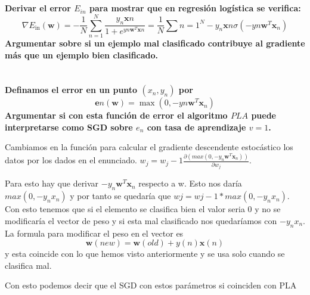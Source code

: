 \documentclass[titlepage]{article}
\begin{document}
  \section{}
	\textbf{Derivar el error $E_{in}$ para mostrar que en regresión logística se verifica: $$\nabla E_{\mathrm{in}}(\mathbf{w})=-\frac{1}{N} \sum_{n=1}^{N} \frac{y_{n} \mathbf{x}{n}}{1+e^{y{n} \mathbf{w}^{T} \mathbf{x}{n}}}=\frac{1}{N} \sum{n=1}^{N}-y_{n} \mathbf{x}{n} \sigma\left(-y{n} \mathbf{w}^{T} \mathbf{x}_{n}\right)$$ 
  	Argumentar sobre si un ejemplo mal clasificado contribuye al gradiente más que un ejemplo bien clasificado.}
  
  	\section{}
  	\textbf{Definamos el error en un punto $(x_n,y_n)$ por $$\mathbf{e}{n}(\mathbf{w})=\max \left(0,-y{n} \mathbf{w}^{T} \mathbf{x}_{n}\right)$$ Argumentar si con esta función de error el algoritmo $PLA$ puede interpretarse como SGD sobre $e_n$ con tasa de aprendizaje $v=1$.}
  	\newline
  	
	Cambiamos en la función para calcular el gradiente descendente estocástico los datos por los dados en el enunciado. $w_{j}=w_{j}-1\frac{\partial(max(0,-y_{n} \mathbf{w}^{T} \mathbf{x}_{n})) }{\partial w_{j}}$. 
	
	Para esto hay que derivar $-y_{n} \mathbf{w}^{T} \mathbf{x}_{n}$ respecto a w. Esto nos daría $max(0,-y_{n}x_n)$ y por tanto se quedaría que $wj = wj-1*max(0,-y_{n}x_n)$.
	Con esto tenemos que si el elemento se clasifica bien el valor seria 0 y no se modificaría el vector de peso y si esta mal clasificado nos quedaríamos con $-y_nx_n$. La formula para modificar el peso en el vector es 	$$
	\mathbf{w}(new)=\mathbf{w}(old)+y(n) \mathbf{x}(n)
	$$
  	y esta coincide con lo que hemos visto anteriormente y se usa solo cuando se clasifica mal. 
  	
  	Con esto podemos decir que el SGD con estos parámetros si coinciden con PLA
  	
  	
\end{document}
